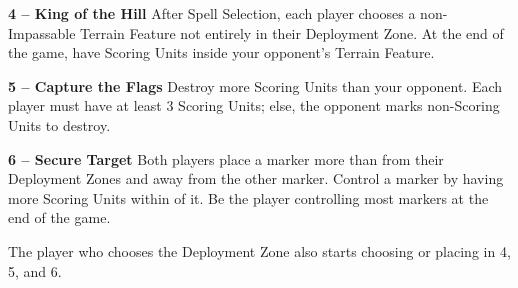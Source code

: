 \begin{minipage}[t]{0.32\textwidth}
\textbf{4 -- King of the Hill}\newline
After Spell Selection, each player chooses a non-Impassable Terrain Feature not entirely in their Deployment Zone. At the end of the game, have Scoring Units inside your opponent's Terrain Feature.
\end{minipage}\hfill\begin{minipage}[t]{0.32\textwidth}
\textbf{5 -- Capture the Flags}\newline
Destroy more Scoring Units than your opponent. Each player must have at least 3 Scoring Units; else, the opponent marks non-Scoring Units to destroy.
\end{minipage}\hfill\begin{minipage}[t]{0.32\textwidth}
\textbf{6 -- Secure Target}\newline
Both players place a marker more than  from their Deployment Zones and  away from the other marker. Control a marker by having more Scoring Units within  of it. Be the player controlling most markers at the end of the game.
\end{minipage}

The player who chooses the Deployment Zone also starts choosing or placing in 4, 5, and 6.


\newpage



